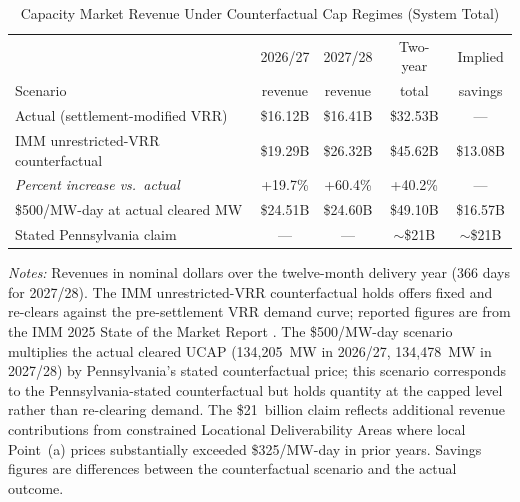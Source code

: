 \begin{table}[H]
  \centering
  \caption{Capacity Market Revenue Under Counterfactual Cap Regimes
    (System Total)}
  \label{tab:capped_revenue}
  \small
  \begin{tabular}{lcccc}
    \toprule
                                                 & 2026/27 & 2027/28 & Two-year & Implied \\
    Scenario                                     & revenue & revenue & total    & savings \\
    \midrule
    Actual (settlement-modified VRR)             & \$16.12B & \$16.41B & \$32.53B & --- \\
    \addlinespace
    IMM unrestricted-VRR counterfactual          & \$19.29B & \$26.32B & \$45.62B & \$13.08B \\
    \quad \textit{Percent increase vs.\ actual}  & +19.7\%  & +60.4\%  & +40.2\%  & --- \\
    \addlinespace
    \$500/MW-day at actual cleared MW            & \$24.51B & \$24.60B & \$49.10B & \$16.57B \\
    \addlinespace
    Stated Pennsylvania claim                    & ---      & ---      & $\sim$\$21B & $\sim$\$21B \\
    \bottomrule
  \end{tabular}
  \vspace{3pt}

  \begin{minipage}{0.96\textwidth}
    \footnotesize \textit{Notes:} Revenues in nominal dollars over the
    twelve-month delivery year (366 days for 2027/28). The IMM
    unrestricted-VRR counterfactual holds offers fixed and re-clears
    against the pre-settlement VRR demand curve; reported figures are
    from the IMM 2025 State of the Market Report
    \citep{MonitoringAnalytics2025_sotm}. The \$500/MW-day scenario
    multiplies the actual cleared UCAP (134{,}205~MW in 2026/27,
    134{,}478~MW in 2027/28) by Pennsylvania's stated counterfactual
    price; this scenario corresponds to the Pennsylvania-stated
    counterfactual but holds quantity at the capped level rather than
    re-clearing demand. The \$21~billion claim
    \citep{Shapiro2025_press_release} reflects additional revenue
    contributions from constrained Locational Deliverability Areas
    where local Point~(a) prices substantially exceeded \$325/MW-day in
    prior years. Savings figures are differences between the
    counterfactual scenario and the actual outcome.
  \end{minipage}
\end{table}

